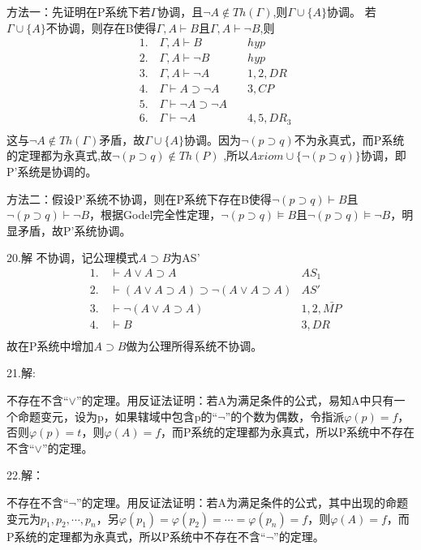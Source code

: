 \documentclass[a4paper]{ctexart}
\begin{document}
方法一：先证明在P系统下若$\Gamma$协调，且$\neg A\not\in Th(\Gamma)$,则$\Gamma\cup \{A\}$协调。
若$\Gamma\cup \{A\}$不协调，则存在B使得$\Gamma,A\vdash B$且$\Gamma,A\vdash \neg B$,则
\begin{align*}
  &1.\quad \Gamma,A\vdash B \quad & hyp \\
  &2.\quad \Gamma,A\vdash \neg B \quad & hyp \\
  &3.\quad \Gamma,A\vdash \neg A \quad & 1,2,DR\\
  &4.\quad \Gamma\vdash A\supset \neg A \quad&  3,CP\\
  &5.\quad \Gamma\vdash \neg A\supset \neg A  \quad & \\
  &6.\quad \Gamma\vdash \neg A \quad & 4,5,DR_3\\
\end{align*}这与$\neg A\not\in Th(\Gamma)$矛盾，故$\Gamma\cup \{A\}$协调。因为$\neg(p\supset q)$不为永真式，而P系统的定理都为永真式,故$\neg(p\supset q)\not\in Th(P)$ ,所以$Axiom\cup\{\neg(p\supset q)\}$协调，即P'系统是协调的。

方法二：假设P'系统不协调，则在P系统下存在B使得$\neg(p\supset q)\vdash B$且$\neg(p\supset q)\vdash \neg B$，根据Godel完全性定理，$\neg(p\supset q)\models B$且$\neg(p\supset q)\models \neg B$，明显矛盾，故P'系统协调。\newline

\noindent 20.解
不协调，记公理模式$A\supset B$为AS'
\begin{align*}
  &1.\quad \vdash A\vee A\supset A &AS_{1} \\
  &2.\quad \vdash (A\vee A\supset A)\supset \neg(A\vee A\supset A)&AS' \\
  &3.\quad \vdash \neg(A\vee A\supset A) &1,2,\bar{MP} \\
  &4.\quad \vdash B &3,DR \\
\end{align*}
故在P系统中增加$A\supset B$做为公理所得系统不协调。\newline

\noindent 21.解:

不存在不含“$\vee$”的定理。用反证法证明：若A为满足条件的公式，易知A中只有一个命题变元，设为p，如果辖域中包含p的“$\neg$”的个数为偶数，令指派$\varphi(p)=f$，否则$\varphi(p)=t$，则$\varphi(A)=f$，而P系统的定理都为永真式，所以P系统中不存在不含“$\vee$”的定理。\newline

\noindent 22.解：

不存在不含“$\neg$”的定理。用反证法证明：若A为满足条件的公式，其中出现的命题变元为$p_1,p_2,\cdots,p_n$，另$\varphi(p_1)=\varphi(p_2)=\cdots=\varphi(p_n)=f$，则$\varphi(A)=f$，而P系统的定理都为永真式，所以P系统中不存在不含“$\neg$”的定理。\newline
\end{document}
